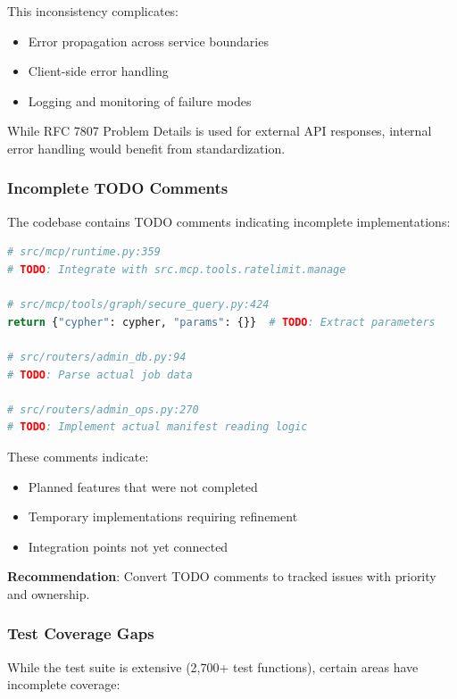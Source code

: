 This inconsistency complicates:
\begin{itemize}
    \item Error propagation across service boundaries
    \item Client-side error handling
    \item Logging and monitoring of failure modes
\end{itemize}

While RFC 7807 Problem Details is used for external API responses, internal error handling would benefit from standardization.

\subsubsection{Incomplete TODO Comments}

The codebase contains TODO comments indicating incomplete implementations:

\begin{lstlisting}[language=Python, caption=Examples of TODO comments in codebase]
# src/mcp/runtime.py:359
# TODO: Integrate with src.mcp.tools.ratelimit.manage

# src/mcp/tools/graph/secure_query.py:424
return {"cypher": cypher, "params": {}}  # TODO: Extract parameters

# src/routers/admin_db.py:94
# TODO: Parse actual job data

# src/routers/admin_ops.py:270
# TODO: Implement actual manifest reading logic
\end{lstlisting}

These comments indicate:
\begin{itemize}
    \item Planned features that were not completed
    \item Temporary implementations requiring refinement
    \item Integration points not yet connected
\end{itemize}

\textbf{Recommendation}: Convert TODO comments to tracked issues with priority and ownership.

\subsubsection{Test Coverage Gaps}

While the test suite is extensive (2,700+ test functions), certain areas have incomplete coverage:

